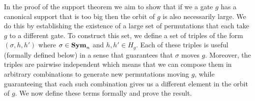 \documentclass[../paper.tex]{subfiles}
\begin{document}



In the proof of the support theorem we aim to show that if we a gate $g$ has a
canonical support that is too big then the orbit of $g$ is also
necessarily large.  We do this by establishing the existence of a
large set of permutations that each take $g$ to a different gate.
To construct this set, we define a set of triples of the form
$(\sigma, h, h')$ where $\sigma \in \text{\textbf{Sym}}_n$ and $h,h' \in H_g$.  Each
of these triples is useful (formally defined below) in a sense that
guarantees that $\sigma$ moves $g$.  Moreover, the triples are pairwise
independent which means that we can compose them in arbitrary
combinations to generate new permutations moving $g$, while
guaranteeing that each such combination gives us a different element
in the orbit of $g$.   We now define these terms formally and prove the result.




\end{document}
